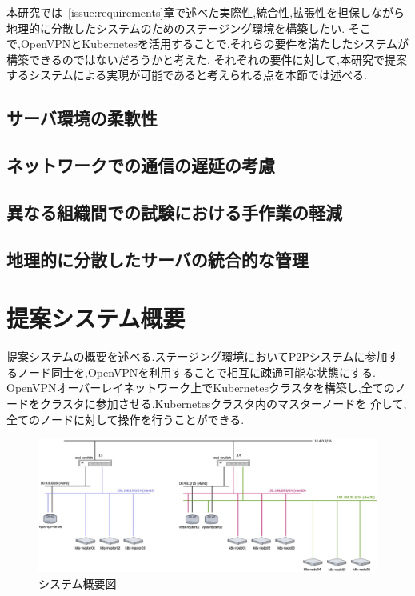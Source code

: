 本研究では~\ref{issue:requirements}章で述べた実際性,統合性,拡張性を担保しながら地理的に分散したシステムのためのステージング環境を構築したい.
そこで,OpenVPNとKubernetesを活用することで,それらの要件を満たしたシステムが構築できるのではないだろうかと考えた.
それぞれの要件に対して,本研究で提案するシステムによる実現が可能であると考えられる点を本節では述べる.

\subsection{サーバ環境の柔軟性}
\label{issue:requirements1}


\subsection{ネットワークでの通信の遅延の考慮}
\label{issue:requirements2}


\subsection{異なる組織間での試験における手作業の軽減}
\label{issue:requirements3}


\subsection{地理的に分散したサーバの統合的な管理}
\label{issue:requirements4}

\section{提案システム概要}
\label{issue:about-system}

提案システムの概要を述べる.ステージング環境においてP2Pシステムに参加するノード同士を,OpenVPNを利用することで相互に疎通可能な状態にする.
OpenVPNオーバーレイネットワーク上でKubernetesクラスタを構築し,全てのノードをクラスタに参加させる.Kubernetesクラスタ内のマスターノードを
介して,全てのノードに対して操作を行うことができる.

\begin{figure}[htbp]
  \begin{center}
    \includegraphics[width=\textwidth]{./figures/system-diagram.jpg}
    \caption{システム概要図}
  \end{center}
\end{figure}

